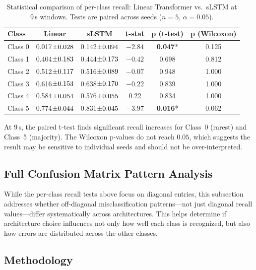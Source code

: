 \begin{table}[htbp]
\centering
\caption{Statistical comparison of per-class recall: Linear Transformer vs.\ \ac{sLSTM} at 9\,s windows. Tests are paired across seeds ($n=5$, $\alpha=0.05$).}
\label{tab:class_comparison_9s}
\small
\setlength{\tabcolsep}{3pt}
\begin{tabular}{l|c|c|c|c|c}
\hline
		\textbf{Class} & \textbf{Linear} & \textbf{\ac{sLSTM}} & \textbf{t-stat} & \textbf{p (t-test)} & \textbf{p (Wilcoxon)} \\
\hline
Class 0 & 0.017$\pm{\scriptsize 0.028}$ & 0.142$\pm{\scriptsize 0.094}$ & $-2.84$ & \textbf{0.047}* & 0.125 \\
Class 1 & 0.404$\pm{\scriptsize 0.183}$ & 0.444$\pm{\scriptsize 0.173}$ & $-0.42$ & 0.698 & 0.812 \\
Class 2 & 0.512$\pm{\scriptsize 0.117}$ & 0.516$\pm{\scriptsize 0.089}$ & $-0.07$ & 0.948 & 1.000 \\
Class 3 & 0.616$\pm{\scriptsize 0.153}$ & 0.638$\pm{\scriptsize 0.170}$ & $-0.22$ & 0.839 & 1.000 \\
Class 4 & 0.584$\pm{\scriptsize 0.054}$ & 0.576$\pm{\scriptsize 0.055}$ & 0.22 & 0.834 & 1.000 \\
Class 5 & 0.774$\pm{\scriptsize 0.044}$ & 0.831$\pm{\scriptsize 0.045}$ & $-3.97$ & \textbf{0.016}* & 0.062 \\
\hline
\end{tabular}
\setlength{\tabcolsep}{6pt}
\end{table}

At 9\,s, the paired t-test finds significant recall increases for Class~0 (rarest) and Class~5 (majority). The Wilcoxon p-values do not reach $0.05$, which suggests the result may be sensitive to individual seeds and should not be over-interpreted.

\subsection{Full Confusion Matrix Pattern Analysis}
\label{app:full_cm_pattern_analysis}

While the per-class recall tests above focus on diagonal entries, this subsection addresses whether off-diagonal misclassification patterns—not just diagonal recall values—differ systematically across architectures. This helps determine if architecture choice influences not only how well each class is recognized, but also how errors are distributed across the other classes.

\subsection{Methodology}


